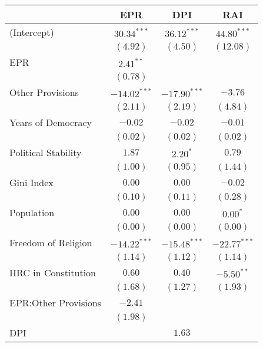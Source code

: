 
\begin{table}[!htbp]
\begin{center}
\begin{tabular}{l c c c}
\hline
 & EPR & DPI & RAI \\
\hline
(Intercept)           & $30.34^{***}$  & $36.12^{***}$  & $44.80^{***}$  \\
                      & $(4.92)$       & $(4.50)$       & $(12.08)$      \\
EPR                   & $2.41^{**}$    &                &                \\
                      & $(0.78)$       &                &                \\
Other Provisions      & $-14.02^{***}$ & $-17.90^{***}$ & $-3.76$        \\
                      & $(2.11)$       & $(2.19)$       & $(4.84)$       \\
Years of Democracy    & $-0.02$        & $-0.02$        & $-0.01$        \\
                      & $(0.02)$       & $(0.02)$       & $(0.02)$       \\
Political Stability   & $1.87$         & $2.20^{*}$     & $0.79$         \\
                      & $(1.00)$       & $(0.95)$       & $(1.44)$       \\
Gini Index            & $0.00$         & $0.00$         & $-0.02$        \\
                      & $(0.10)$       & $(0.11)$       & $(0.28)$       \\
Population            & $0.00$         & $0.00$         & $0.00^{*}$     \\
                      & $(0.00)$       & $(0.00)$       & $(0.00)$       \\
Freedom of Religion   & $-14.22^{***}$ & $-15.48^{***}$ & $-22.77^{***}$ \\
                      & $(1.14)$       & $(1.12)$       & $(1.14)$       \\
HRC in Constitution   & $0.60$         & $0.40$         & $-5.50^{**}$   \\
                      & $(1.68)$       & $(1.27)$       & $(1.93)$       \\
EPR:Other Provisions  & $-2.41$        &                &                \\
                      & $(1.98)$       &                &                \\
DPI                   &                & $1.63$         &                \\

\end{tabular}
\end{center}
\end{table}
